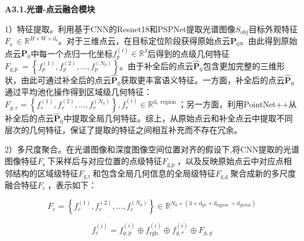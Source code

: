 \documentclass[12pt]{article}
\begin{document}

\textbf{A3.1.光谱-点云融合模块}

1）特征提取。利用基于CNN的Resnet18和PSPNet提取光谱图像$S_{\mathrm{obj}}$目标外观特征$F_{\text {s }} \in \mathbb{R}^{H \times W \times \mathrm{d}_{\mathrm{s}}}$。对于三维点云，在目标定位阶段获得原始点云$\boldsymbol{P}_0$。由此得到原始点云$\boldsymbol{P}_0$中每一个点归一化坐标$f_p^{(i)} \in \mathbb{R}^3$后得到的点级几何特征$F_{\text {g,p }} = \left\{f_p^{(1)}, f_p^{(2)}, \ldots, f_p^{\left(N_0\right)}\right\}$。由于补全后的点云$\hat{\boldsymbol{P}}_0$包含更加完整的三维形状，由此可通过补全后的点云$\hat{\boldsymbol{P}}_0$获取更丰富语义特征。一方面，补全后的点云$\hat{\boldsymbol{P}}_0$通过平均池化操作得到区域级几何特征：$F_{g, r}=\left\{f_r^{(1)}, f_r^{(2)}, \ldots, f_r^{\left(N_0\right)}\right\}, f_r^{(i)} \in \mathbb{R}^{\mathrm{d}_r \text { region }}$；另一方面，利用PointNet++从补全后的点云$\hat{\boldsymbol{P}}_0$中提取全局几何特征。综上，从原始点云和补全点云中提取不同层次的几何特征，保证了提取的特征之间相互补充而不存在冗余。

2）多尺度聚合。在光谱图像和深度图像空间位置对齐的假设下,将CNN提取的光谱图像特征$F_{\text {s }}$下采样后与对应位置的点级特征$F_{\text {g,p }}$，以及反映原始点云中对应点相邻结构的区域级特征$F_{\text {g,r }}$和包含全局几何信息的全局级特征$F_{\text {g,g }}$聚合成新的多尺度融合特征$F_{\text {c }}$，表示如下：

\begin{equation}
    F_c  =\left\{f_c^{(1)}, f_c^{(2)}, \ldots, f_c^{\left(N_0\right)}\right\} \in \mathbb{R}^{N_0 \times\left(3+\mathrm{d}_{\mathrm{gb}}+\mathrm{d}_{\text {rggion }}+\mathrm{d}_{\mathrm{global}}\right)}
\end{equation}

\begin{equation}
    f_c^{(i)}  =f_{g, p}^{(i)} \oplus f_{\text {rgb }}^{(i)} \oplus f_{g, r}^{(i)} \oplus F_{g, g}
\end{equation}

\end{document}
